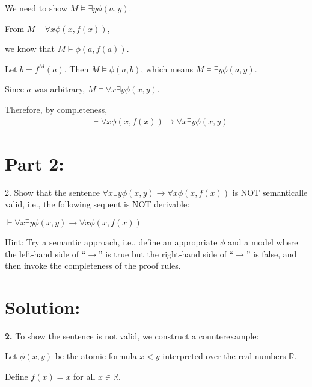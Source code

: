 \documentclass{article}
\begin{document}
We need to show $M \models \exists y \phi(a, y)$.

\vspace{1em}
From $M \models \forall x \phi(x, f(x))$, 

\vspace{1em}
we know that $M \models \phi(a, f(a))$.

\vspace{1em}
Let $b = f^M(a)$. Then $M \models \phi(a, b)$, which means $M \models \exists y \phi(a, y)$.

\vspace{1em}
Since $a$ was arbitrary, $M \models \forall x \exists y \phi(x, y)$.

\vspace{1em}
Therefore, by completeness, 
\[\begin{aligned}
    & \vdash \forall x \phi(x, f(x)) \rightarrow \forall x \exists y \phi(x, y)
\end{aligned}\]
\newpage


\section*{Part 2:}


\begin{mdframed}
    2. Show that the sentence $\forall x \exists y \phi(x, y) \rightarrow \forall x \phi(x, f (x))$ is NOT
    semanticalle valid, i.e., the following sequent is NOT derivable:
      \vspace{1em}
      
    $\vdash \forall x\exists y \phi(x, y) \rightarrow \forall x \phi(x, f (x))$
      \vspace{1em}
      
    Hint: Try a semantic approach, i.e., define an appropriate $\phi$ and a
    model where the left-hand side of “$\rightarrow$” is true but the right-hand side
    of “$\rightarrow$” is false, and then invoke the completeness of the proof rules.
\end{mdframed}
\section*{Solution:}
\textbf{2.} To show the sentence is not valid, we construct a counterexample:

\vspace{1em}
Let $\phi(x,y)$ be the atomic formula $x < y$ interpreted over the real numbers $\mathbb{R}$.

\vspace{1em}
Define $f(x) = x$ for all $x \in \mathbb{R}$.
\end{document}
